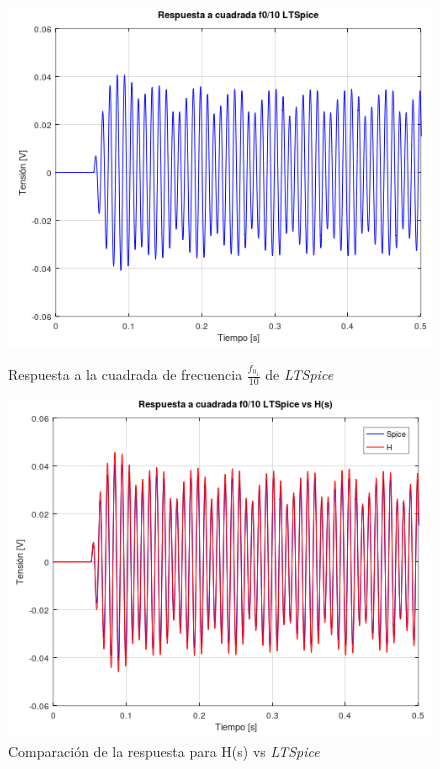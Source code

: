 \documentclass[11pt,a4paper]{report}
\begin{document}
\begin{figure}[h!]
\centering
\includegraphics[scale=0.8]{rtaCuadradaBaja1Spice.png}
\caption{Respuesta a la cuadrada de frecuencia $\frac{f_{0_{1}}}{10}$ de \textit{LTSpice}}
\includegraphics[scale=0.8]{rtaCuadradaBaja1SpiceComp.png}
\caption{Comparación de la respuesta para H(s) vs \textit{LTSpice}}
\end{figure}
\newpage 
\end{document}
